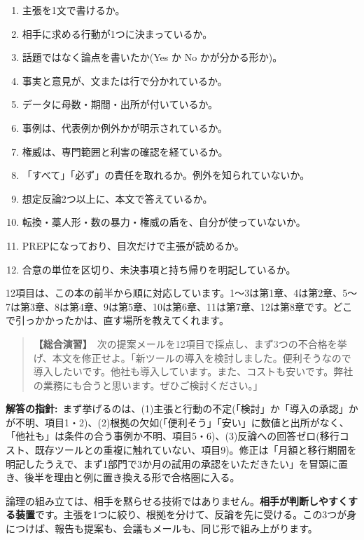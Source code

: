 \documentclass{article}
\begin{document}
\begin{enumerate}
\item 主張を1文で書けるか。
\item 相手に求める行動が1つに決まっているか。
\item 話題ではなく論点を書いたか(Yes か No かが分かる形か)。
\item 事実と意見が、文または行で分かれているか。
\item データに母数・期間・出所が付いているか。
\item 事例は、代表例か例外かが明示されているか。
\item 権威は、専門範囲と利害の確認を経ているか。
\item 「すべて」「必ず」の責任を取れるか。例外を知られていないか。
\item 想定反論2つ以上に、本文で答えているか。
\item 転換・藁人形・数の暴力・権威の盾を、自分が使っていないか。
\item PREPになっており、目次だけで主張が読めるか。
\item 合意の単位を区切り、未決事項と持ち帰りを明記しているか。
\end{enumerate}

12項目は、この本の前半から順に対応しています。1〜3は第1章、4は第2章、5〜7は第3章、8は第4章、9は第5章、10は第6章、11は第7章、12は第8章です。どこで引っかかったかは、直す場所を教えてくれます。

\begin{quote}
\textbf{【総合演習】}\ 次の提案メールを12項目で採点し、まず3つの不合格を挙げ、本文を修正せよ。「新ツールの導入を検討しました。便利そうなので導入したいです。他社も導入しています。また、コストも安いです。弊社の業務にも合うと思います。ぜひご検討ください。」
\end{quote}

\textbf{解答の指針:}\ まず挙げるのは、(1)主張と行動の不定(「検討」か「導入の承認」かが不明、項目1・2)、(2)根拠の欠如(「便利そう」「安い」に数値と出所がなく、「他社も」は条件の合う事例か不明、項目5・6)、(3)反論への回答ゼロ(移行コスト、既存ツールとの重複に触れていない、項目9)。修正は「月額と移行期間を明記したうえで、まず1部門で3か月の試用の承認をいただきたい」を冒頭に置き、後半を理由と例に置き換える形で合格圏に入る。

論理の組み立ては、相手を黙らせる技術ではありません。\textbf{相手が判断しやすくする装置}です。主張を1つに絞り、根拠を分けて、反論を先に受ける。この3つが身につけば、報告も提案も、会議もメールも、同じ形で組み上がります。
\end{document}
